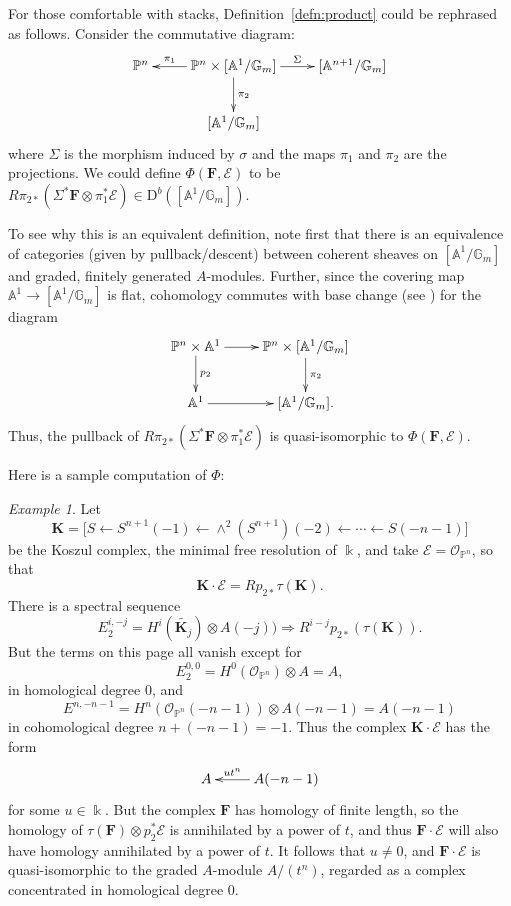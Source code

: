 \documentclass[12pt]{amsart}
\theoremstyle{definition}
\theoremstyle{remark}
\newtheorem{example}[lemma]{Example}
\newcommand{\Spec}{\operatorname{Spec}}
\newcommand{\kk}{\Bbbk}
\newcommand{\PP}{\mathbb{P}}
\renewcommand{\AA}{\mathbb{A}}
\newcommand{\GG}{\mathbb{G}}
\newcommand{\cO}{\mathcal{O}}
\newcommand{\cE}{\mathcal{E}}
\newcommand{\bK}{\mathbf{K}}
\newcommand{\FF}{\mathbf{F}}
\newcommand{\DD}{\mathrm{D}}
\begin{document}
For those comfortable with stacks, Definition~\ref{defn:product}
could be rephrased as follows. Consider the commutative diagram:
\[
\xymatrix{
\PP^n&\PP^{n}\times [\AA^1/\GG_m]\ar[l]_-{\pi_{1}} \ar[r]^-{\Sigma} \ar[d]^{\pi_2}&[\AA^{n+1}/\GG_m]\\
&[\AA^1/\GG_m]&%
}
\]
where $\Sigma$ is the morphism induced by $\sigma$ and the maps $\pi_1$ and $\pi_2$ are the projections.  We could define $\Phi(\FF,\cE)$ to be $R\pi_{2*}\left( \Sigma^*\FF\otimes \pi_{1}^{*}\cE\right)\in \DD^b([\AA^1/\GG_m])$.

To see why this is an equivalent definition, note first  that there is an equivalence of categories (given by pullback/descent) between coherent sheaves on $[\AA^1/\GG_m]$ and graded, finitely generated $A$-modules. Further, since the covering map $\AA^1\to [\AA^1/\GG_m]$ is flat, cohomology commutes with base change (see \cite[0765]{stacks-project}) for the diagram
\[
\xymatrix{
\PP^n\times \AA^1\ar[r]\ar[d]^-{p_2}&\PP^{n}\times [\AA^1/\GG_m]\ar[d]^{\pi_2}\\
\AA^1\ar[r]&[\AA^1/\GG_m].
}
\]
Thus, the pullback of $R\pi_{2*}\left( \Sigma^*\FF\otimes \pi_{1}^{*}\cE\right)$ is quasi-isomorphic 
to $\Phi(\FF,\cE)$.

Here is a sample computation of $\Phi$: 

\begin{example} Let 
$$
\bK = \bigl[ S\gets S^{n+1}(-1) \gets \wedge^{2}(S^{n+1})(-2) \gets\cdots\gets S(-n-1)\bigr]
$$
be the Koszul complex, the minimal free resolution of $\kk$, and take
$\cE = \cO_{\PP^{n}}$, so that 
$$
\bK \cdot \cE = Rp_{2*}\tau(\bK).$$  
There is a spectral sequence
\[
E_2^{i,-j}=H^i(\widetilde{\bK_j})\otimes A(-j))\Rightarrow R^{i-j}p_{2*}(\tau(\bK)).
\]
But 
the terms on this page all vanish except for
$$
E^{0,0}_2= H^{0}(\cO_{\PP^{n}})\otimes A = A,
$$
in homological degree 0, and 
$$
E^{n,-n-1}=H^{n}(\cO_{\PP^{n}}(-n-1)) \otimes  A(-n-1) = A(-n-1)
$$
in cohomological degree $n+(-n-1) = -1$.
Thus the complex $\bK \cdot \cE$ has the form
$$
\xymatrix{
A&A(-n-1)\ar[l]_-{ut^{n}}
}
$$
for some $u\in \kk$. But the complex $\FF$ has homology of finite length, so the homology of $\tau(\FF) \otimes p_{2}^{*}\cE$ is annihilated by a power of $t$, and thus $\FF\cdot \cE$ will also have homology annihilated by a power of $t$. It follows that $u\neq 0$, and $\FF\cdot \cE$ is quasi-isomorphic to the graded $A$-module $A/(t^{n})$, regarded as a complex concentrated in homological degree 0.
\end{example}
\end{document}
